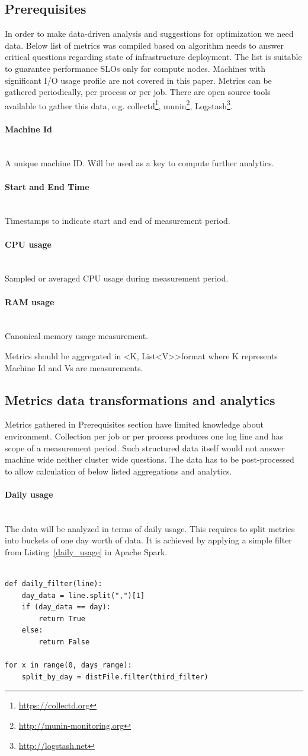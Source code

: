 \documentclass[]{final_report}
\newcommand{\myparagraph}[1]{\paragraph{#1}\mbox{}\\}
\begin{document}
\subsection{Prerequisites} 

In order to make data-driven analysis and suggestions for optimization we need data. Below list of metrics was compiled based on algorithm needs to answer critical questions regarding state of infrastructure deployment. The list is suitable to guarantee performance SLOs only for compute nodes. Machines with significant I/O usage profile are not covered in this paper. 
Metrics can be gathered periodically, per process or per job. There are open source tools available to gather this data, e.g. collectd\footnote{\url{https://collectd.org}}, munin\footnote{\url{http://munin-monitoring.org}}, Logstash\footnote{\url{http://logstash.net}}.

\myparagraph{Machine Id}
A unique machine ID. Will be used as a key to compute further analytics.

\myparagraph{Start and End Time}
Timestamps to indicate start and end of measurement period.

\myparagraph{CPU usage}
Sampled or averaged CPU usage during measurement period. 

\myparagraph{RAM usage}
Canonical memory usage measurement. 

Metrics should be aggregated in \textless K, List\textless V\textgreater\textgreater format where K represents Machine Id and Vs are measurements. 

\subsection{Metrics data transformations and analytics}

Metrics gathered in Prerequisites section have limited knowledge about environment. Collection per job or per process produces one log line and has scope of a measurement period. Such structured data itself would not answer machine wide neither cluster wide questions. The data has to be post-processed to allow calculation of below listed aggregations and analytics.   

\myparagraph{Daily usage}

The data will be analyzed in terms of daily usage. This requires to split metrics into buckets of one day worth of data. 
It is achieved by applying a simple filter from Listing~\ref{daily_usage} in Apache Spark.

\begin{lstlisting}[label={daily_usage},caption={Daily usage filter},frame=single]

def daily_filter(line):
    day_data = line.split(",")[1]
    if (day_data == day):
        return True
    else:
        return False

for x in range(0, days_range):
    split_by_day = distFile.filter(third_filter)

\end{lstlisting} 
\end{document}
